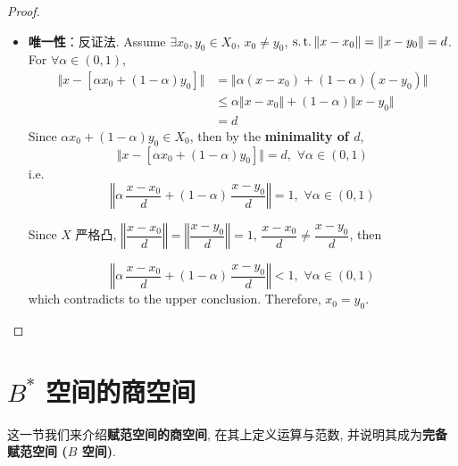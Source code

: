 \begin{proposition}
\begin{proof}
\begin{itemize}
				\vspace{8em}
				
				\item \textbf{唯一性}：反证法. Assume $\exists x_0 , y_0 \in X_0$, $x_0 \neq y_0$, $\operatorname{s.t.} \Vert x - x_0 \Vert = \Vert x - y_0 \Vert = d$. \\
				For $\forall \alpha \in (0 , 1)$, 
				\begin{align}
				\Big\Vert x - [\alpha x_0 + (1 - \alpha) y_0] \Big\Vert 
				&= \Big\Vert \alpha (x - x_0) + (1 - \alpha) (x - y_0) \Big\Vert \\
				&\leq \alpha \Vert x - x_0 \Vert + (1 - \alpha) \Vert x - y_0 \Vert \\
				&= d
				\end{align}
				Since $\alpha x_0 + (1 - \alpha) y_0 \in X_0$, then by the \textbf{minimality of $d$}, 
				\[ \Big\Vert x - [\alpha x_0 + (1 - \alpha) y_0] \Big\Vert = d , \,\, \forall \alpha \in (0 , 1) \]
				i.e.
				\[ \left\Vert \alpha \, \frac{x - x_0}{d} + (1 - \alpha) \, \frac{x - y_0}{d} \right\Vert = 1 , \,\, \forall \alpha \in (0 , 1) \]
				
				\vspace{2em}
				
				Since $X$ 严格凸, $\left\Vert \dfrac{x - x_0}{d} \right\Vert = \left\Vert \dfrac{x - y_0}{d} \right\Vert = 1$, $\dfrac{x - x_0}{d} \neq \dfrac{x - y_0}{d}$, then 
				
				\[ \left\Vert \alpha \, \frac{x - x_0}{d} + (1 - \alpha) \, \frac{x - y_0}{d} \right\Vert < 1 , \,\, \forall \alpha \in (0 , 1) \]
				which contradicts to the upper conclusion. Therefore, $x_0 = y_0$.
			\end{itemize}
		\end{proof}
	\end{proposition}

\newpage

\section{$B^*$ 空间的商空间}
	这一节我们来介绍\textbf{赋范空间的商空间}, 在其上定义运算与范数, 并说明其成为\textbf{完备赋范空间 ($B$ 空间)}. 
	
	\vspace{1em}
	
